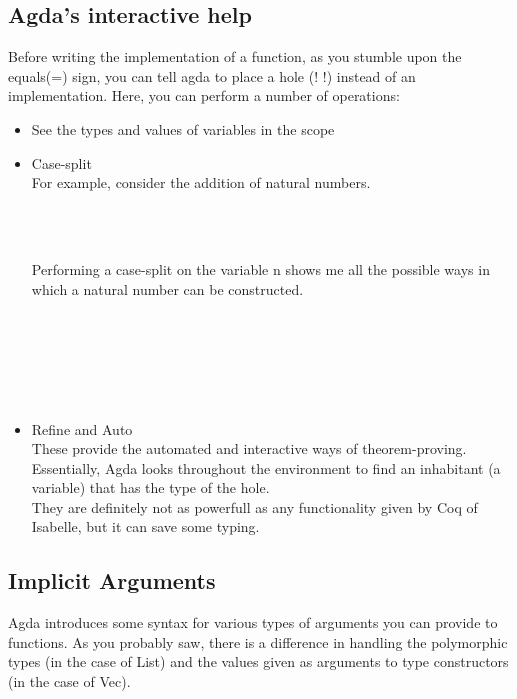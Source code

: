 \documentclass[12pt,twoside,notitlepage]{report}
\begin{document}
\subsection{Agda's interactive help}

Before writing the implementation of a function, as you stumble upon the equals(=) sign,
you can tell agda to place a hole ({! !}) instead of an implementation. Here, you can
perform a number of operations:
  \begin {itemize}
  \item{See the types and values of variables in the scope}
  \item{Case-split} \\
    For example, consider the addition of natural numbers. \\
    \begin{code}
    \\
\>\AgdaFunction{\_+\_} \AgdaSymbol{:}     \<%
\\
\> \AgdaFunction{+}  \AgdaSymbol{=} \<%
    \end{code}
    Performing a case-split on the variable n shows me all the possible ways in which a natural number can be constructed. \\
   \begin{code}
   \\
\>\AgdaFunction{\_+\_} \AgdaSymbol{:}     \<%
\\
\> \AgdaFunction{+}  \AgdaSymbol{=} \<%
\\
\>  \AgdaFunction{+}  \AgdaSymbol{=} \<%
\end{code}\\
  \item{Refine and Auto} \\
    These provide the automated and interactive ways of theorem-proving. Essentially, Agda looks throughout the environment to find
    an inhabitant (a variable) that has the type of the hole. \\
    They are definitely not as powerfull as any functionality given by Coq of Isabelle, but it can save some typing.

  \end{itemize}

\subsection{Implicit Arguments}
  Agda introduces some syntax for various types of arguments you can provide to functions. As you probably saw,
  there is a difference in handling the polymorphic types (in the case of List) and the values given as arguments
  to type constructors (in the case of Vec). \\
\end{document}
